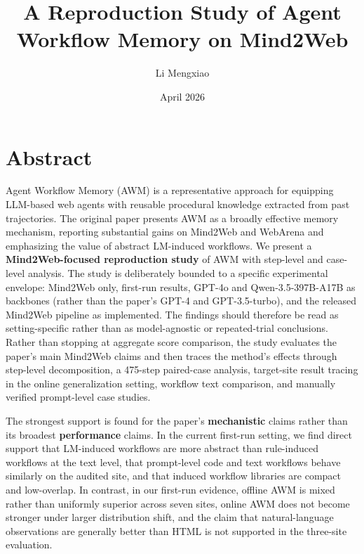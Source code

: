\documentclass{article}
\title{A Reproduction Study of Agent Workflow Memory on Mind2Web}
\author{Li Mengxiao}
\date{April 2026}
\begin{document}
\maketitle
\tableofcontents
\newpage

\section*{Abstract}

Agent Workflow Memory (AWM) is a representative approach for equipping
LLM-based web agents with reusable procedural knowledge extracted from
past trajectories. The original paper presents AWM as a broadly
effective memory mechanism, reporting substantial gains on Mind2Web and
WebArena and emphasizing the value of abstract LM-induced workflows.
We present a \textbf{Mind2Web-focused reproduction study} of AWM with
step-level and case-level analysis. The study is deliberately bounded
to a specific experimental envelope: Mind2Web only, first-run results,
GPT-4o and Qwen-3.5-397B-A17B as backbones (rather than the paper's
GPT-4 and GPT-3.5-turbo), and the released Mind2Web pipeline as
implemented. The
findings should therefore be read as setting-specific rather than as
model-agnostic or repeated-trial conclusions. Rather than stopping at
aggregate score comparison, the study evaluates the paper's main
Mind2Web claims and then traces the method's effects through
step-level decomposition, a 475-step paired-case analysis, target-site
result tracing in the online generalization setting, workflow text
comparison, and manually verified prompt-level case studies.

The strongest support is found for the paper's \textbf{mechanistic}
claims rather than its broadest \textbf{performance} claims. In the
current first-run setting, we find direct support that LM-induced
workflows are more abstract than rule-induced workflows at the text
level, that prompt-level code and text workflows behave similarly on
the audited site, and that induced workflow libraries are compact and
low-overlap. In contrast, in our first-run evidence, offline AWM is
mixed rather than uniformly superior across seven sites, online AWM
does not become stronger under larger distribution shift, and the claim
that natural-language observations are generally better than HTML is not
supported in the three-site evaluation.
\end{document}
